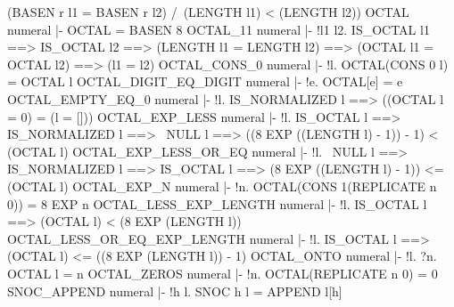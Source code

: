       (BASEN r l1 = BASEN r l2) /\
      (LENGTH l1) < (LENGTH l2))
\ENDTHEOREM
\THEOREM OCTAL numeral
|- OCTAL = BASEN 8
\ENDTHEOREM
\THEOREM OCTAL\_11 numeral
|- !l1 l2.
    IS_OCTAL l1 ==>
    IS_OCTAL l2 ==>
    (LENGTH l1 = LENGTH l2) ==>
    (OCTAL l1 = OCTAL l2) ==>
    (l1 = l2)
\ENDTHEOREM
\THEOREM OCTAL\_CONS\_0 numeral
|- !l. OCTAL(CONS 0 l) = OCTAL l
\ENDTHEOREM
\THEOREM OCTAL\_DIGIT\_EQ\_DIGIT numeral
|- !e. OCTAL[e] = e
\ENDTHEOREM
\THEOREM OCTAL\_EMPTY\_EQ\_0 numeral
|- !l. IS_NORMALIZED l ==> ((OCTAL l = 0) = (l = []))
\ENDTHEOREM
\THEOREM OCTAL\_EXP\_LESS numeral
|- !l.
    IS_OCTAL l ==>
    IS_NORMALIZED l ==>
    ~NULL l ==>
    ((8 EXP ((LENGTH l) - 1)) - 1) < (OCTAL l)
\ENDTHEOREM
\THEOREM OCTAL\_EXP\_LESS\_OR\_EQ numeral
|- !l.
    ~NULL l ==>
    IS_NORMALIZED l ==>
    IS_OCTAL l ==>
    (8 EXP ((LENGTH l) - 1)) <= (OCTAL l)
\ENDTHEOREM
\THEOREM OCTAL\_EXP\_N numeral
|- !n. OCTAL(CONS 1(REPLICATE n 0)) = 8 EXP n
\ENDTHEOREM
\THEOREM OCTAL\_LESS\_EXP\_LENGTH numeral
|- !l. IS_OCTAL l ==> (OCTAL l) < (8 EXP (LENGTH l))
\ENDTHEOREM
\THEOREM OCTAL\_LESS\_OR\_EQ\_EXP\_LENGTH numeral
|- !l. IS_OCTAL l ==> (OCTAL l) <= ((8 EXP (LENGTH l)) - 1)
\ENDTHEOREM
\THEOREM OCTAL\_ONTO numeral
|- !l. ?n. OCTAL l = n
\ENDTHEOREM
\THEOREM OCTAL\_ZEROS numeral
|- !n. OCTAL(REPLICATE n 0) = 0
\ENDTHEOREM
\THEOREM SNOC\_APPEND numeral
|- !h l. SNOC h l = APPEND l[h]
\ENDTHEOREM
